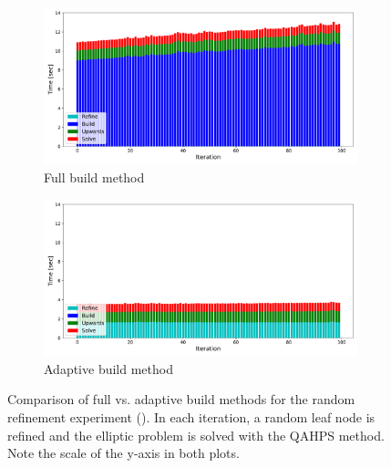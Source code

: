 \begin{figure}
    \centering
    \begin{subfigure}[t]{1\textwidth}
        \includegraphics[width=\textwidth, clip=true, trim={10 10 10 10}]{figures/full-stacked-bar-no-title.pdf}
        \caption{Full build method}
        \label{fig:full-time-comparison}
    \end{subfigure}
    \begin{subfigure}[t]{1\textwidth}
        \includegraphics[width=\textwidth, clip=true, trim={10 10 10 10}]{figures/adaptive-stacked-bar-no-title.pdf}
        \caption{Adaptive build method}
        \label{fig:adaptive-time-comparison}
    \end{subfigure}
    \caption{Comparison of full vs. adaptive build methods for the random refinement experiment (). In each iteration, a random leaf node is refined and the elliptic problem is solved with the QAHPS method. Note the scale of the y-axis in both plots.}
    \label{fig:full-vs-adaptive-time-comparison}
\end{figure}